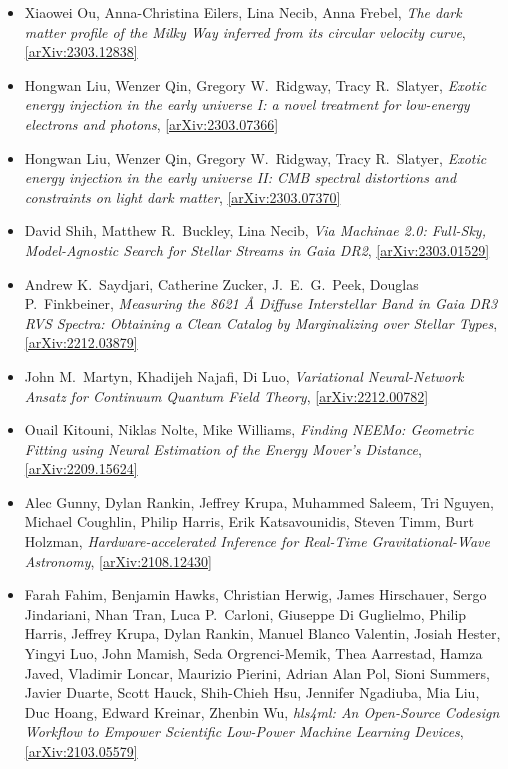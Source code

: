 \begin{itemize}
\item Xiaowei Ou, Anna-Christina Eilers, Lina Necib, Anna Frebel, \textit{The dark matter profile of the Milky Way inferred from its circular velocity curve}, \href{https://arxiv.org/abs/2303.12838}{[arXiv:2303.12838]} 
\item Hongwan Liu, Wenzer Qin, Gregory W.\  Ridgway, Tracy R.\  Slatyer, \textit{Exotic energy injection in the early universe I: a novel treatment for low-energy electrons and photons}, \href{https://arxiv.org/abs/2303.07366}{[arXiv:2303.07366]} 
\item Hongwan Liu, Wenzer Qin, Gregory W.\  Ridgway, Tracy R.\  Slatyer, \textit{Exotic energy injection in the early universe II: CMB spectral distortions and constraints on light dark matter}, \href{https://arxiv.org/abs/2303.07370}{[arXiv:2303.07370]} 
\item David Shih, Matthew R.\  Buckley, Lina Necib, \textit{Via Machinae 2.0: Full-Sky, Model-Agnostic Search for Stellar Streams in Gaia DR2}, \href{https://arxiv.org/abs/2303.01529}{[arXiv:2303.01529]} 
\item Andrew K.\  Saydjari, Catherine Zucker, J.\  E.\  G.\  Peek, Douglas P.\  Finkbeiner, \textit{Measuring the 8621 Å Diffuse Interstellar Band in Gaia DR3 RVS Spectra: Obtaining a Clean Catalog by Marginalizing over Stellar Types}, \href{https://arxiv.org/abs/2212.03879}{[arXiv:2212.03879]} 
\item John M.\  Martyn, Khadijeh Najafi, Di Luo, \textit{Variational Neural-Network Ansatz for Continuum Quantum Field Theory}, \href{https://arxiv.org/abs/2212.00782}{[arXiv:2212.00782]} 
\item Ouail Kitouni, Niklas Nolte, Mike Williams, \textit{Finding NEEMo: Geometric Fitting using Neural Estimation of the Energy Mover's Distance}, \href{https://arxiv.org/abs/2209.15624}{[arXiv:2209.15624]} 
\item Alec Gunny, Dylan Rankin, Jeffrey Krupa, Muhammed Saleem, Tri Nguyen, Michael Coughlin, Philip Harris, Erik Katsavounidis, Steven Timm, Burt Holzman, \textit{Hardware-accelerated Inference for Real-Time Gravitational-Wave Astronomy}, \href{https://arxiv.org/abs/2108.12430}{[arXiv:2108.12430]} 
\item Farah Fahim, Benjamin Hawks, Christian Herwig, James Hirschauer, Sergo Jindariani, Nhan Tran, Luca P.\  Carloni, Giuseppe Di Guglielmo, Philip Harris, Jeffrey Krupa, Dylan Rankin, Manuel Blanco Valentin, Josiah Hester, Yingyi Luo, John Mamish, Seda Orgrenci-Memik, Thea Aarrestad, Hamza Javed, Vladimir Loncar, Maurizio Pierini, Adrian Alan Pol, Sioni Summers, Javier Duarte, Scott Hauck, Shih-Chieh Hsu, Jennifer Ngadiuba, Mia Liu, Duc Hoang, Edward Kreinar, Zhenbin Wu, \textit{hls4ml: An Open-Source Codesign Workflow to Empower Scientific Low-Power Machine Learning Devices}, \href{https://arxiv.org/abs/2103.05579}{[arXiv:2103.05579]} 
\end{itemize}